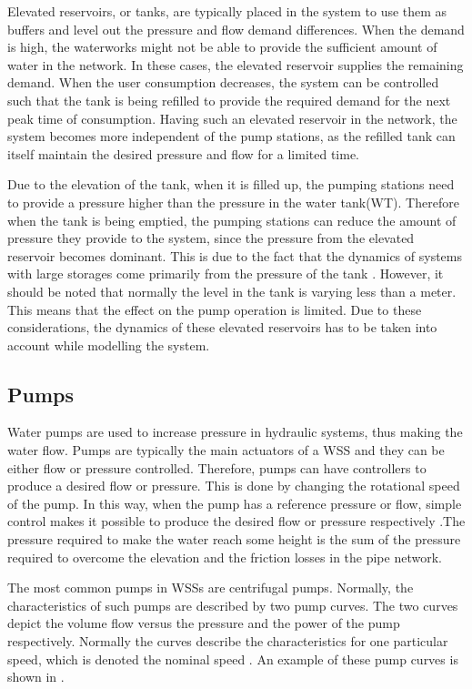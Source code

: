 Elevated reservoirs, or tanks, are typically placed in the system to use them as buffers and level out the pressure and flow demand differences. When the demand is high, the waterworks might not be able to provide the sufficient amount of water in the network. In these cases, the elevated reservoir supplies the remaining demand. When the user consumption decreases, the system can be controlled such that the tank is being refilled to provide the required demand for the next peak time of consumption. Having such an elevated reservoir in the network, the system becomes more independent of the pump stations, as the refilled tank can itself maintain the desired pressure and flow for a limited time. 

Due to the elevation of the tank, when it is filled up, the pumping stations need to provide a pressure higher than the pressure in the water tank(WT). Therefore when the tank is being emptied, the pumping stations can reduce the amount of pressure they provide to the system, since the pressure from the elevated reservoir becomes dominant. This is due to the fact that the dynamics of systems with large storages come primarily from the pressure of the tank \cite{8thsemester_project}. However, it should be noted that normally the level in the tank is varying less than a meter. This means that the effect on the pump operation is limited. Due to these considerations, the dynamics of these elevated reservoirs has to be taken into account while modelling the system. 

\subsection{Pumps}
\label{pumps}

Water pumps are used to increase pressure in hydraulic systems, thus making the water flow. Pumps are typically the main actuators of a WSS and they can be either flow or pressure controlled. Therefore, pumps can have controllers to produce a desired flow or pressure. This is done by changing the rotational speed of the pump. In this way, when the pump has a reference pressure or flow, simple control makes it possible to produce the desired flow or pressure respectively \cite{kallesoePHD}.The pressure required to make the water reach some height is the sum of the pressure required to overcome the elevation and the friction losses in the pipe network. 

The most common pumps in WSSs are centrifugal pumps. Normally, the characteristics of such pumps are described by two pump curves. The two curves depict the volume flow versus the pressure and the power of the pump respectively. Normally the curves describe the characteristics for one particular speed, which is denoted the nominal speed \cite{kallesoePHD}. An example of these pump curves is shown in .


